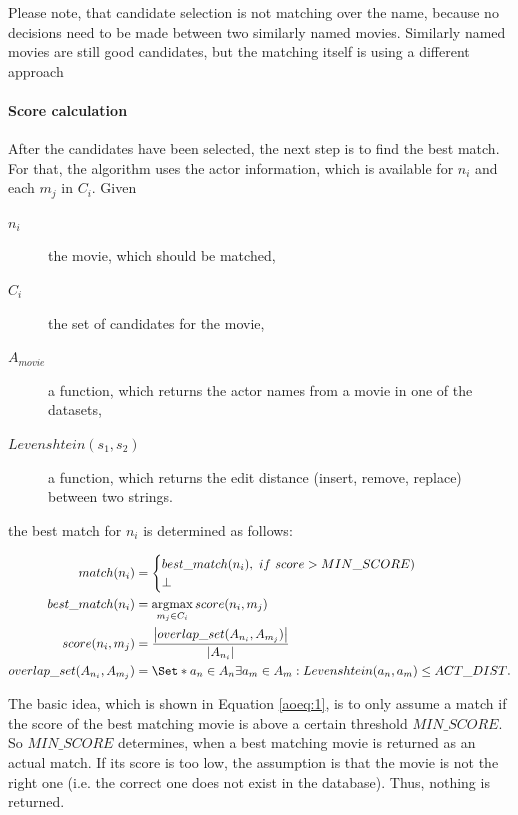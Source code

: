 Please note, that candidate selection is not matching over the name, because no decisions need to be made between two similarly named movies.
Similarly named movies are still good candidates, but the matching itself is using a different approach

\paragraph{Score calculation}
After the candidates have been selected, the next step is to find the best match.
For that, the algorithm uses the actor information, which is available for $n_i$ and each $m_j$ in $C_i$.
Given
\begin{description}
	\item[$n_i$] the movie, which should be matched,
	\item[$C_i$] the set of candidates for the movie,
	\item[$A_{movie}$] a function, which returns the actor names from a movie in one of the datasets,
	\item[$Levenshtein(s_1, s_2)$] a function, which returns the edit distance (insert, remove, replace) between two strings.
\end{description}
the best match for $n_i$ is determined as follows:

\begin{align}
	match(n_i) &=
		\begin{cases}
			best\_match(n_i),~if~score > MIN\_SCORE) \\
			\bot
		\end{cases}\label{aoeq:1}\\
	best\_match(n_i) &=
		\argmax_{m_j \in C_i} score(n_i, m_j)\label{aoeq:2}\\
	score(n_i, m_j) &=
		\frac
			{\left\lvert overlap\_set(A_{n_i}, A_{m_j}) \right\rvert}
			{\left\lvert A_{n_i} \right\rvert}\label{aoeq:3}\\
	overlap\_set(A_{n_i}, A_{m_j}) &=
		\Set*{a_n \in A_n}{\exists a_m \in A_m: Levenshtein(a_n, a_m) \leq ACT\_DIST}.\label{aoeq:4}
\end{align}

The basic idea, which is shown in Equation \ref{aoeq:1}, is to only assume a match if the score of the best matching movie is above a certain threshold $MIN\_SCORE$.
So $MIN\_SCORE$ determines, when a best matching movie is returned as an actual match.
If its score is too low, the assumption is that the movie is not the right one (i.e. the correct one does not exist in the database).
Thus, nothing is returned.

